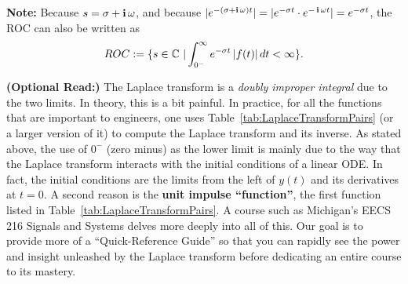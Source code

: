 \begin{tcolorbox}[colback=mylightblue, title = {\bf The Laplace Transform}, breakable]
\begin{definition}
\vspace*{.2cm}

\textbf{Note:} Because $s = \sigma + \mathop{\bm{\mathrm i}} \omega$, and because $|e^{-(\sigma + \mathop{\bm{\mathrm i}} \omega) t}| = |e^{-\sigma t} \cdot e^{-\mathop{\bm{\mathrm i}} \omega t}| = e^{-\sigma t}$, the ROC can also be written as 
\begin{equation}
\label{eq:ROC02}
    ROC:=\{s \in \mathbb C~|\int_{0^-}^\infty e^{-\sigma t}\, |f(t)|\, dt < \infty \}. 
\end{equation}
\vspace*{.2cm}

\end{definition}
 
\end{tcolorbox}



\vspace*{.2cm}

\begin{rem}
    \textbf{(Optional Read:)} The Laplace transform is a \textit{doubly improper integral} due to the two limits. In theory, this is a bit painful. In practice, for all the functions that are important to engineers, one uses Table~\ref{tab:LaplaceTransformPairs} (or a larger version of it) to compute the Laplace transform and its inverse. As stated above, the use of $0^{-}$ (zero minus) as the lower limit is mainly due to the way that the Laplace transform interacts with the initial conditions of a linear ODE. In fact, the initial conditions are the limits from the left of $y(t)$ and its derivatives at $t=0$.  A second reason is the \textbf{unit impulse ``function''}, the first function listed in Table~\ref{tab:LaplaceTransformPairs}. A course such as Michigan's EECS 216 Signals and Systems delves more deeply into all of this. Our goal is to provide more of a ``Quick-Reference Guide'' so that you can rapidly see the power and insight unleashed by the Laplace transform before dedicating an entire course to its mastery. 
\end{rem}

